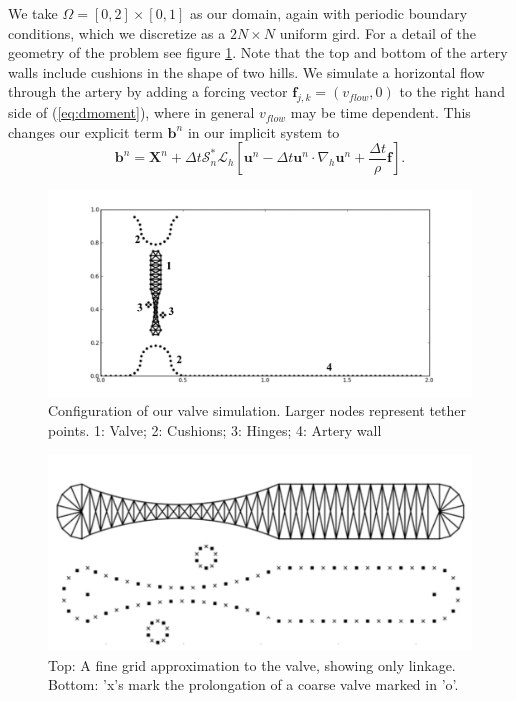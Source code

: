 \documentclass[preprint,12pt]{elsarticle}
\begin{document}
We take $\Omega=[0,2]\times[0,1]$ as our domain, again with periodic boundary conditions, which we discretize as a $2N\times N$ uniform gird. For a detail of the geometry of the problem see figure \ref{fig:ValveGeometry}. Note that the top and bottom of the artery walls include cushions in the shape of two hills. We simulate a horizontal flow through the artery by adding a forcing vector $\mathbf{f}_{j,k}=(v_{flow},0)$ to the right hand side of (\ref{eq:dmoment}), where in general $v_{flow}$ may be time dependent. This changes our explicit term $\mathbf{b}^n$ in our implicit system to
\begin{equation}
\mathbf{b}^n=\mathbf{X}^n + \Delta t\mathcal{S}^*_n\mathcal{L}_h
\left[ \mathbf{u}^n - \Delta t\mathbf{u}^n \cdot \nabla_h \mathbf{u}^n + \frac{\Delta t}{\rho} \mathbf{f} \right].
\end{equation}
\begin{figure}[!b]
  \begin{center}
    \includegraphics[bb=1in .3in 11.5in 5.85in,width=5.25in,clip]{ValveGeometry.pdf}
  \end{center}
  \caption{\small Configuration of our valve simulation. Larger nodes represent tether points. 1: Valve; 2: Cushions; 3: Hinges; 4: Artery wall}
  \label{fig:ValveGeometry}
\end{figure}
\begin{figure}[!b]
  \begin{center}
    \includegraphics[bb=0in 0in 7.25in 3.3in,width=5.25in,clip]{Valve1.pdf}
  \end{center}
  \caption{\small Top: A fine grid approximation to the valve, showing only linkage. Bottom: 'x's mark the prolongation of a coarse valve marked in 'o'.}
  \label{fig:Valve1}
\end{figure}
\end{document}
